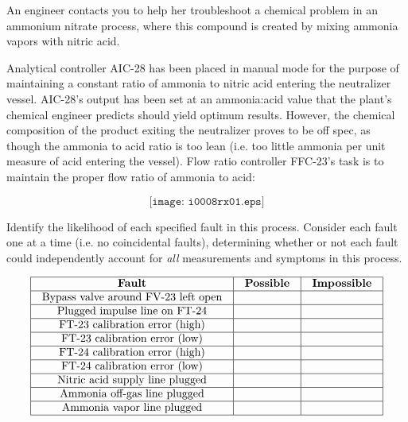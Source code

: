 

An engineer contacts you to help her troubleshoot a chemical problem in an ammonium nitrate process, where this compound is created by mixing ammonia vapors with nitric acid.

Analytical controller AIC-28 has been placed in manual mode for the purpose of maintaining a constant ratio of ammonia to nitric acid entering the neutralizer vessel.  AIC-28's output has been set at an ammonia:acid value that the plant's chemical engineer predicts should yield optimum results.  However, the chemical composition of the product exiting the neutralizer proves to be off spec, as though the ammonia to acid ratio is too lean (i.e. too little ammonia per unit measure of acid entering the vessel).  Flow ratio controller FFC-23's task is to maintain the proper flow ratio of ammonia to acid:

$$\texttt{[image: i0008rx01.eps]}$$

Identify the likelihood of each specified fault in this process.  Consider each fault one at a time (i.e. no coincidental faults), determining whether or not each fault could independently account for {\it all} measurements and symptoms in this process.


$$\vbox{\offinterlineskip
\halign{\strut
\vrule \quad\hfil # \ \hfil & 
\vrule \quad\hfil # \ \hfil & 
\vrule \quad\hfil # \ \hfil \vrule \cr
\noalign{\hrule}
%
{\bf Fault} & {\bf Possible} & {\bf Impossible} \cr
%
\noalign{\hrule}
%
Bypass valve around FV-23 left open &  &  \cr
%
\noalign{\hrule}
%
Plugged impulse line on FT-24 &  &  \cr
%
\noalign{\hrule}
%
FT-23 calibration error (high) &  &  \cr
%
\noalign{\hrule}
%
FT-23 calibration error (low) &  &  \cr
%
\noalign{\hrule}
%
FT-24 calibration error (high) &  &  \cr
%
\noalign{\hrule}
%
FT-24 calibration error (low) &  &  \cr
%
\noalign{\hrule}
%
Nitric acid supply line plugged &  &  \cr
%
\noalign{\hrule}
%
Ammonia off-gas line plugged &  &  \cr
%
\noalign{\hrule}
%
Ammonia vapor line plugged &  &  \cr
%
\noalign{\hrule}
} %
}$$ %

